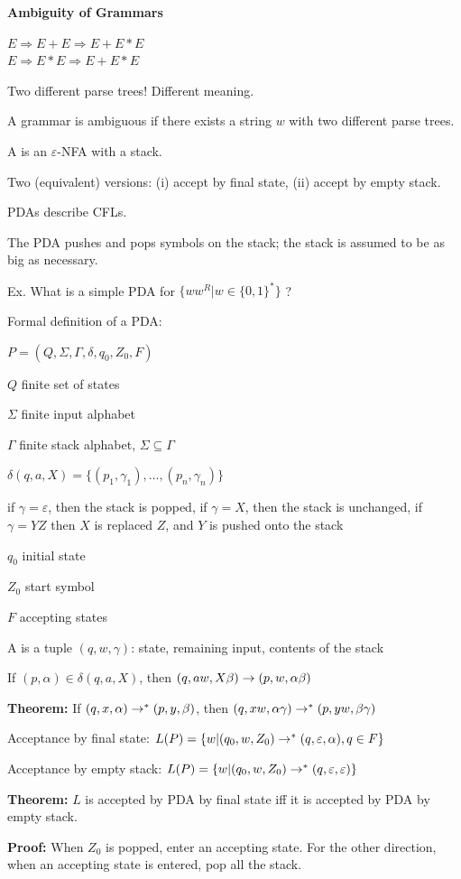 \begin{frame}

{\bf Ambiguity of Grammars}

$E\Rightarrow E+E\Rightarrow E+E*E$ \\
$E\Rightarrow E*E\Rightarrow E+E*E$

Two different parse trees!  Different meaning.

A grammar is ambiguous if there exists a string $w$ with two different
parse trees.
\end{frame}

\begin{frame}

A  is an $\varepsilon$-NFA with a stack.

Two (equivalent) versions: (i) accept by final state, (ii) accept by
empty stack.

PDAs describe CFLs.

The PDA pushes and pops symbols on the stack; the stack is assumed to
be as big as necessary.

Ex.  What is a simple PDA for $\{ww^R|w\in\{0,1\}^*\}$ ?
\end{frame}

\begin{frame}
Formal definition of a PDA:

$P=(Q,\Sigma,\Gamma,\delta,q_0,Z_0,F)$

$Q$ finite set of states

$\Sigma$ finite input alphabet

$\Gamma$ finite stack alphabet, $\Sigma\subseteq\Gamma$

$\delta(q,a,X)=\{(p_1,\gamma_1),\ldots,(p_n,\gamma_n)\}$

if $\gamma=\varepsilon$, then the stack is popped, if $\gamma=X$, then
the stack is unchanged, if $\gamma=YZ$ then $X$ is replaced $Z$, and
$Y$ is pushed onto the stack

$q_0$ initial state

$Z_0$ start symbol

$F$ accepting states
\end{frame}

\begin{frame}

A  is a tuple $(q,w,\gamma)$:
state, remaining input, contents of the stack

If $(p,\alpha)\in\delta(q,a,X)$, then
$(q,aw,X\beta)\rightarrow(p,w,\alpha\beta)$

{\bf Theorem:} If $(q,x,\alpha)\rightarrow^*(p,y,\beta)$, then
$(q,xw,\alpha\gamma)\rightarrow^*(p,yw,\beta\gamma)$

Acceptance by final state:
$L(P)=\{w|(q_0,w,Z_0)\rightarrow^*(q,\varepsilon,\alpha),q\in F\}$

Acceptance by empty stack:
$L(P)=\{w|(q_0,w,Z_0)\rightarrow^*(q,\varepsilon,\varepsilon)\}$

{\bf Theorem:} $L$ is accepted by PDA by final state iff it is
accepted by PDA by empty stack.

{\bf Proof:} When $Z_0$ is popped, enter an accepting state.  For the
other direction, when an accepting state is entered, pop all the
stack.
\end{frame}


